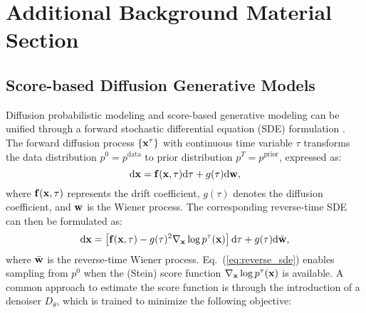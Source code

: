 \section{Additional Background Material Section}
\label{appendix:additional_background}

\subsection{Score-based Diffusion Generative Models}

Diffusion probabilistic modeling \cite{sohl2015deep, ho2020ddpm, dhariwal2021diffusion} and score-based generative modeling \cite{song2019generative, song2020improved, chao2022denoising} can be unified through a forward stochastic differential equation (SDE) formulation \cite{song2021scorebased}. The forward diffusion process $\{{\mathbf{x}}^{\tau}\}$ with continuous time variable $\tau$ transforms the data distribution $p^0 = p^{\text{data}}$ to prior distribution $p^T = p^{\text{prior}}$, expressed as:
\begin{equation}
\mathrm{d}{\mathbf{x}} = {\mathbf{f}}({\mathbf{x}},\tau)\mathrm{d}\tau + g(\tau)\mathrm{d}{\mathbf{w}},
\end{equation}
where ${\mathbf{f}}({\mathbf{x}},\tau)$ represents the drift coefficient, $g(\tau)$ denotes the diffusion coefficient, and ${\mathbf{w}}$ is the Wiener process. The corresponding reverse-time SDE 
can then be formulated as:
\begin{equation}
\mathrm{d}{\mathbf{x}} = \left[{\mathbf{f}}({\mathbf{x}},\tau) - g(\tau)^2 \nabla_{\mathbf{x}}\log p^{\tau}({\mathbf{x}})\right]\mathrm{d}\tau + g(\tau)\mathrm{d}\bar{{\mathbf{w}}},
\label{eq:reverse_sde}
\end{equation}
where $\bar{{\mathbf{w}}}$ is the reverse-time Wiener process. Eq.~(\ref{eq:reverse_sde}) enables sampling from $p^0$ when the (Stein) score function $\nabla_{\mathbf{x}}\log p^{\tau}({\mathbf{x}})$ is available.
A common approach to estimate the score function is through the introduction of a denoiser $D_\theta$, which is trained to minimize the following objective:

